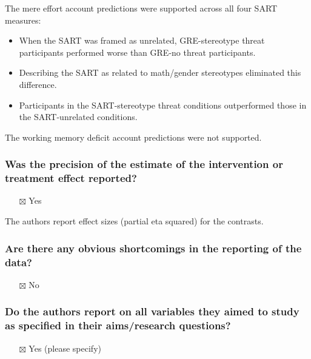 \documentclass[
  doc, a4paper]{apa7}
\providecommand{\tightlist}{%
  \setlength{\itemsep}{0pt}\setlength{\parskip}{0pt}}
\begin{document}
The mere effort account predictions were supported across all four SART measures:

\begin{itemize}
\tightlist
\item
  When the SART was framed as unrelated, GRE-stereotype threat participants performed worse than GRE-no threat participants.
\item
  Describing the SART as related to math/gender stereotypes eliminated this difference.
\item
  Participants in the SART-stereotype threat conditions outperformed those in the SART-unrelated conditions.
\end{itemize}

The working memory deficit account predictions were not supported.

\subsubsection{Was the precision of the estimate of the intervention or treatment effect reported?}\label{was-the-precision-of-the-estimate-of-the-intervention-or-treatment-effect-reported}

\begin{itemize}
\tightlist
\item[$\boxtimes$]
  Yes
\end{itemize}

The authors report effect sizes (partial eta squared) for the contrasts.

\subsubsection{Are there any obvious shortcomings in the reporting of the data?}\label{are-there-any-obvious-shortcomings-in-the-reporting-of-the-data}

\begin{itemize}
\tightlist
\item[$\boxtimes$]
  No
\end{itemize}

\subsubsection{Do the authors report on all variables they aimed to study as specified in their aims/research questions?}\label{do-the-authors-report-on-all-variables-they-aimed-to-study-as-specified-in-their-aimsresearch-questions}

\begin{itemize}
\tightlist
\item[$\boxtimes$]
  Yes (please specify)
\end{itemize}
\end{document}
